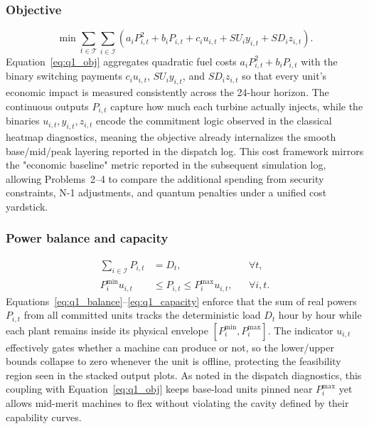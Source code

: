 \documentclass{apmcmthesis}
\begin{document}
\subsubsection{Objective}
\begin{equation}
    \label{eq:q1_obj}
    \min \sum_{t\in\mathcal{T}} \sum_{i\in\mathcal{I}} \left(a_i P_{i,t}^2 + b_i P_{i,t} + c_i u_{i,t} + SU_i y_{i,t} + SD_i z_{i,t}\right).
\end{equation}
\noindent Equation~\eqref{eq:q1_obj} aggregates quadratic fuel costs $a_i P_{i,t}^2 + b_i P_{i,t}$ with the binary switching payments $c_i u_{i,t}$, $SU_i y_{i,t}$, and $SD_i z_{i,t}$ so that every unit's economic impact is measured consistently across the 24-hour horizon.
The continuous outputs $P_{i,t}$ capture how much each turbine actually injects, while the binaries $u_{i,t},y_{i,t},z_{i,t}$ encode the commitment logic observed in the classical heatmap diagnostics, meaning the objective already internalizes the smooth base/mid/peak layering reported in the dispatch log.
This cost framework mirrors the "economic baseline" metric reported in the subsequent simulation log, allowing Problems~2--4 to compare the additional spending from security constraints, N-1 adjustments, and quantum penalties under a unified cost yardstick.

\subsubsection{Power balance and capacity}
\begin{align}
    \sum_{i\in\mathcal{I}} P_{i,t} &= D_t, && \forall t, \label{eq:q1_balance} \\
    P_i^{\min} u_{i,t} &\le P_{i,t} \le P_i^{\max} u_{i,t}, && \forall i,t. \label{eq:q1_capacity}
\end{align}
\noindent Equations~\eqref{eq:q1_balance}--\eqref{eq:q1_capacity} enforce that the sum of real powers $P_{i,t}$ from all committed units tracks the deterministic load $D_t$ hour by hour while each plant remains inside its physical envelope $[P_i^{\min},P_i^{\max}]$.
The indicator $u_{i,t}$ effectively gates whether a machine can produce or not, so the lower/upper bounds collapse to zero whenever the unit is offline, protecting the feasibility region seen in the stacked output plots.
As noted in the dispatch diagnostics, this coupling with Equation~\eqref{eq:q1_obj} keeps base-load units pinned near $P_i^{\max}$ yet allows mid-merit machines to flex without violating the cavity defined by their capability curves.
\end{document}
